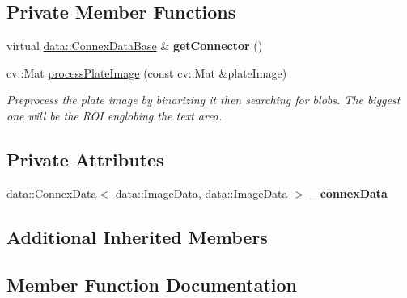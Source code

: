 \subsection*{Private Member Functions}
\begin{DoxyCompactItemize}
\item 
\mbox{\label{classfilter_1_1algos_1_1_i_d_plate_cropper_a13a1acc4ae917be6162040456094347a}} 
virtual \hyperlink{classfilter_1_1data_1_1_connex_data_base}{data\+::\+Connex\+Data\+Base} \& {\bfseries get\+Connector} ()
\item 
cv\+::\+Mat \hyperlink{classfilter_1_1algos_1_1_i_d_plate_cropper_a1ac43e82954727fc623910f8eb7260ca}{process\+Plate\+Image} (const cv\+::\+Mat \&plate\+Image)
\begin{DoxyCompactList}\small\item\em Preprocess the plate image by binarizing it then searching for blobs. The biggest one will be the R\+OI englobing the text area. \end{DoxyCompactList}\end{DoxyCompactItemize}
\subsection*{Private Attributes}
\begin{DoxyCompactItemize}
\item 
\mbox{\label{classfilter_1_1algos_1_1_i_d_plate_cropper_aa003aba2f7ec0cc7d57f4ad9e82239bf}} 
\hyperlink{classfilter_1_1data_1_1_connex_data}{data\+::\+Connex\+Data}$<$ \hyperlink{classfilter_1_1data_1_1_image_data}{data\+::\+Image\+Data}, \hyperlink{classfilter_1_1data_1_1_image_data}{data\+::\+Image\+Data} $>$ {\bfseries \+\_\+connex\+Data}
\end{DoxyCompactItemize}
\subsection*{Additional Inherited Members}


\subsection{Member Function Documentation}
\mbox{\label{classfilter_1_1algos_1_1_i_d_plate_cropper_a1ac43e82954727fc623910f8eb7260ca}} 
